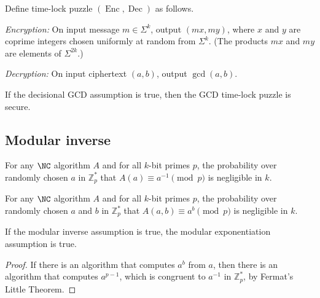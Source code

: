 \documentclass{article}
\newcommand{\Enc}{\operatorname{Enc}}
\newcommand{\Dec}{\operatorname{Dec}}
\newcommand{\Zp}{\mathbb{Z}^*_p}
\begin{document}
\begin{protocol}
  Define time-lock puzzle $(\Enc, \Dec)$ as follows.

  \emph{Encryption:} On input message $m \in \Sigma^k$, output $(mx, my)$, where $x$ and $y$ are coprime integers chosen uniformly at random from $\Sigma^k$. (The products $mx$ and $my$ are elements of $\Sigma^{2k}$.)

  \emph{Decryption:} On input ciphertext $(a, b)$, output $\gcd(a, b)$.
\end{protocol}

\begin{conjecture}
  If the decisional GCD assumption is true, then the GCD time-lock puzzle is secure.
\end{conjecture}

\subsection{Modular inverse}

\begin{assumption}
  For any $\NC$ algorithm $A$ and for all $k$-bit primes $p$, the probability over randomly chosen $a$ in $\Zp$ that $A(a) \equiv a^{-1} \pmod{p}$ is negligible in $k$.
\end{assumption}

\begin{assumption}
  For any $\NC$ algorithm $A$ and for all $k$-bit primes $p$, the probability over randomly chosen $a$ and $b$ in $\Zp$ that $A(a, b) \equiv a^b \pmod{p}$ is negligible in $k$.
\end{assumption}

\begin{proposition}
  If the modular inverse assumption is true, the modular exponentiation assumption is true.
\end{proposition}
\begin{proof}
  If there is an algorithm that computes $a^b$ from $a$, then there is an algorithm that computes $a^{p - 1}$, which is congruent to $a^{-1}$ in $\Zp$, by Fermat's Little Theorem.
\end{proof}


\end{document}
